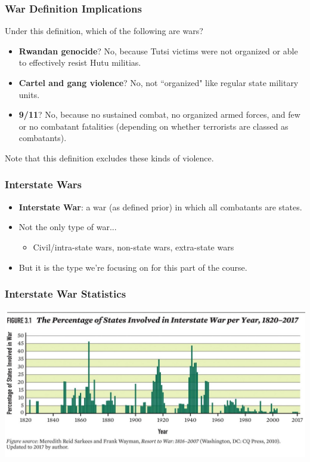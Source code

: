 \documentclass[handout]{beamer}
\begin{document}
\begin{frame} 
	\frametitle{\LARGE{War Definition Implications}}
	Under this definition, which of the following are wars? \pause
	\begin{itemize}
		\item \textbf{Rwandan genocide}? \pause No, because Tutsi victims were not organized or able to effectively resist Hutu militias. \pause
		\item \textbf{Cartel and gang violence}? \pause No, not ``organized" like regular state military units. \pause
		\item \textbf{9/11}? \pause No, because no sustained combat, no organized armed forces, and few or no combatant fatalities (depending on whether terrorists are classed as combatants). \pause	
	\end{itemize}
	Note that this definition excludes these kinds of violence.
\end{frame}

\begin{frame} 
	\frametitle{\LARGE{Interstate Wars}}
	\begin{itemize}
		\item \textbf{Interstate War}: a war (as defined prior)	in which all combatants are states. \pause
		\item Not the only type of war...
		\begin{itemize}
			\item Civil/intra-state wars, non-state wars, extra-state wars \pause
		\end{itemize}
		\item But it is the type we're focusing on for this part of the course.
	\end{itemize}
\end{frame}

\begin{frame} 
	\frametitle{\LARGE{Interstate War Statistics}}	
	\centering
	\includegraphics[width=\textwidth,height=0.9\textheight,keepaspectratio]{percentinterstatewar.jpg}
\end{frame}
\end{document}
